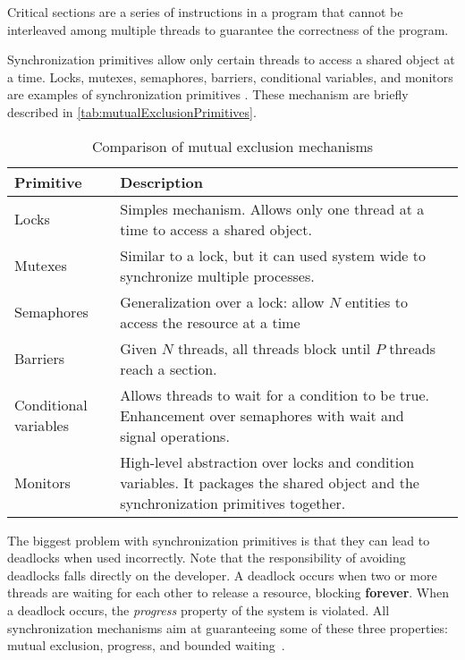 \begin{tcolorbox}[colback=blue!5!white, colframe=blue!75!black, title=Critical Section]
    Critical sections are a series of instructions in a program that cannot
    be interleaved among multiple threads to guarantee the correctness of the program.
\end{tcolorbox}

Synchronization primitives allow
only certain threads to access a shared object at a time.
Locks, mutexes, semaphores, barriers, conditional variables, and monitors
are examples of synchronization primitives \cite{andrews1983conceptsOfConcurrency,csf2025synchronizationPrimitives}.
These mechanism are briefly described in \autoref{tab:mutualExclusionPrimitives}.

\begin{table}[!htp]
    \caption{Comparison of mutual exclusion mechanisms}
    \label{tab:mutualExclusionPrimitives}
    \centering
    \begin{tabularx}{\textwidth}{|l|X|X|}
        \hline
        \textbf{Primitive} & \textbf{Description}\\
        \hline
        Locks & 
        Simples mechanism. Allows only one thread at a time to access a shared object.\\
        \hline
        Mutexes & 
        Similar to a lock, but it can used system wide to synchronize multiple processes.\\
        \hline
        Semaphores & 
        Generalization over a lock: allow $N$ entities to access the resource at a time\\
        \hline
        Barriers &
        Given $N$ threads, all threads block until $P$ threads reach a section.\\
        \hline
        Conditional variables &
        Allows threads to wait for a condition to be true. Enhancement
        over semaphores with wait and signal operations.\\
        \hline
        Monitors &
        High-level abstraction over locks and condition variables. It packages
        the shared object and the synchronization primitives together.\\
        \hline
    \end{tabularx}
\end{table}

The biggest problem with synchronization primitives is that they can
lead to deadlocks when used incorrectly. Note that
the responsibility of avoiding deadlocks falls directly on the developer.
A deadlock occurs when two or more threads are waiting
for each other to release a resource, blocking \textbf{forever}.
When a deadlock occurs, the \textit{progress} property
of the system is violated. All synchronization mechanisms aim
at guaranteeing some of these three properties:
mutual exclusion, progress, and bounded waiting~\cite{csf2025synchronizationPrimitives}.


